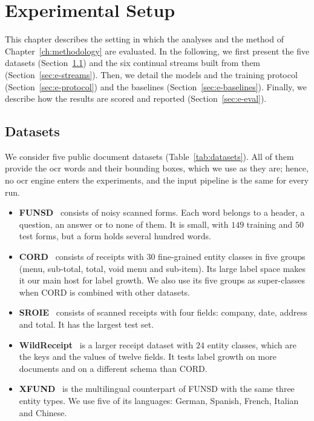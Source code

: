 \chapter{Experimental Setup}
\label{ch:experimental-setup}

This chapter describes the setting in which the analyses and the method of
Chapter~\ref{ch:methodology} are evaluated. In the following, we first present the five
datasets (Section~\ref{sec:e-datasets}) and the six continual streams built from them
(Section~\ref{sec:e-streams}). Then, we detail the models and the training protocol
(Section~\ref{sec:e-protocol}) and the baselines (Section~\ref{sec:e-baselines}). Finally, we
describe how the results are scored and reported (Section~\ref{sec:e-eval}).

\section{Datasets}
\label{sec:e-datasets}

We consider five public document datasets (Table~\ref{tab:datasets}). All of them provide
the \gls{ocr} words and their bounding boxes, which we use as they are; hence, no \gls{ocr}
engine enters the experiments, and the input pipeline is the same for every run.

\begin{itemize}
  \item \textbf{FUNSD}~\citep{jaume2019funsd} consists of noisy scanned forms. Each word
        belongs to a header, a question, an answer or to none of them. It is small, with
        $149$ training and $50$ test forms, but a form holds several hundred words.
  \item \textbf{CORD}~\citep{park2019cord} consists of receipts with $30$ fine-grained
        entity classes in five groups (menu, sub-total, total, void menu and sub-item). Its
        large label space makes it our main host for label growth. We also use its five
        groups as super-classes when CORD is combined with other datasets.
  \item \textbf{SROIE}~\citep{huang2019sroie} consists of scanned receipts with four fields:
        company, date, address and total. It has the largest test set.
  \item \textbf{WildReceipt}~\citep{sun2021sdmgr} is a larger receipt dataset with $24$
        entity classes, which are the keys and the values of twelve fields. It tests label
        growth on more documents and on a different schema than CORD.
  \item \textbf{XFUND}~\citep{xu2022xfund} is the multilingual counterpart of FUNSD with the
        same three entity types. We use five of its languages: German, Spanish, French,
        Italian and Chinese.
\end{itemize}

